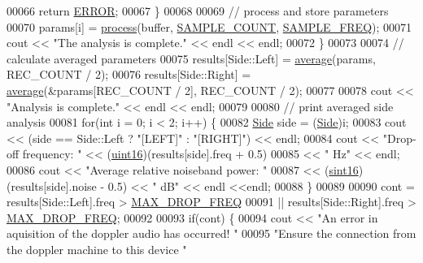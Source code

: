 \begin{DoxyCode}
00066                 \textcolor{keywordflow}{return} \hyperlink{definitions_8hpp_a876fcacb67d51738e846a3312dc08fbb}{ERROR};
00067             \}
00068 
00069             \textcolor{comment}{// process and store parameters}
00070             params[i] = \hyperlink{namespaceavda_a5196cce27286d08ca144a460caee7839}{process}(buffer, \hyperlink{definitions_8hpp_ad3af99f5e7cbf2af51be580e91faa934}{SAMPLE\_COUNT}, 
      \hyperlink{definitions_8hpp_a8ace559345ecba7978591ac2ef22aea4}{SAMPLE\_FREQ});
00071             cout << \textcolor{stringliteral}{"The analysis is complete."} << endl << endl;
00072         \}
00073 
00074         \textcolor{comment}{// calculate averaged parameters}
00075         results[Side::Left] = \hyperlink{namespaceavda_a2a830f24a59aa2538ea82f6e000cce61}{average}(params, REC\_COUNT / 2);
00076         results[Side::Right] = \hyperlink{namespaceavda_a2a830f24a59aa2538ea82f6e000cce61}{average}(&params[REC\_COUNT / 2], REC\_COUNT / 2);
00077 
00078         cout << \textcolor{stringliteral}{"Analysis is complete."} << endl << endl;
00079 
00080         \textcolor{comment}{// print averaged side analysis}
00081         \textcolor{keywordflow}{for}(\textcolor{keywordtype}{int} i = 0; i < 2; i++) \{
00082             \hyperlink{namespaceavda_af723e82f0d3d45fda6fdc01f6a492786}{Side} side = (\hyperlink{namespaceavda_af723e82f0d3d45fda6fdc01f6a492786}{Side})i;
00083             cout << (side == Side::Left ? \textcolor{stringliteral}{"[LEFT]"} : \textcolor{stringliteral}{"[RIGHT]"}) << endl;
00084             cout << \textcolor{stringliteral}{"Drop-off frequency: "} << (\hyperlink{definitions_8hpp_a05f6b0ae8f6a6e135b0e290c25fe0e4e}{uint16})(results[side].freq + 0.5)
00085                 << \textcolor{stringliteral}{" Hz"} << endl;
00086             cout << \textcolor{stringliteral}{"Average relative noiseband power: "}
00087                 << (\hyperlink{definitions_8hpp_a74df79fde3c518e55b29ce6360a9c76e}{sint16})(results[side].noise - 0.5) << \textcolor{stringliteral}{" dB"} << endl <<endl;
00088         \}
00089 
00090         cont = results[Side::Left].freq > \hyperlink{definitions_8hpp_ab506614aee9be52f401d8d573a8d172c}{MAX\_DROP\_FREQ}
00091             || results[Side::Right].freq > \hyperlink{definitions_8hpp_ab506614aee9be52f401d8d573a8d172c}{MAX\_DROP\_FREQ};
00092 
00093         \textcolor{keywordflow}{if}(cont) \{
00094             cout << \textcolor{stringliteral}{"An error in aquisition of the doppler audio has occurred! "}
00095                 \textcolor{stringliteral}{"Ensure the connection from the doppler machine to this device "}

\end{DoxyCode}
